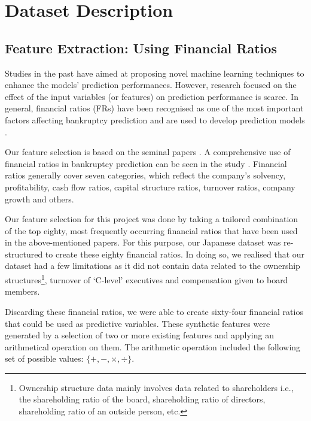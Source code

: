 \section{Dataset Description}

\subsection{Feature Extraction: Using Financial Ratios}

Studies in the past have aimed at proposing novel machine learning techniques to enhance the models’ prediction performances. However, research focused on the effect of the input variables (or features) on prediction performance is scarce.
In general, financial ratios (FRs) have been recognised as one of the most important factors affecting bankruptcy prediction and are used to develop prediction models \cite{Altman,beaver1967financial,ohlson1980financial}.

Our feature selection is based on the seminal papers \cite{Altman,beaver2005have,hardle2009variable,tian2017financial,tian2015variable, ding2012class}. A comprehensive use of financial ratios in bankruptcy prediction can be seen in the study \cite{liang2016financial}.
Financial ratios generally cover seven categories, which reflect the company’s solvency, profitability, cash flow ratios, capital structure ratios, turnover ratios, company growth and others.

Our feature selection for this project was done by taking a tailored combination of the top eighty, most frequently occurring financial ratios that have been used in the above-mentioned papers.
For this purpose, our Japanese dataset was re-structured to create these eighty financial ratios. In doing so, we realised that our dataset had a few limitations as it did not contain data related to the ownership structures\footnote{Ownership structure data mainly involves data related to shareholders i.e., the shareholding ratio of the board, shareholding ratio of directors, shareholding ratio of an outside person, etc.},  turnover of  `C-level' executives and compensation given to board members.

Discarding these financial ratios, we were able to create sixty-four financial ratios that could be used as predictive variables. These synthetic features were generated by a selection of two or more existing features and applying an arithmetical operation on them. The arithmetic operation included the following set of possible values: $\{{+,-, \times,\div}\}$.

